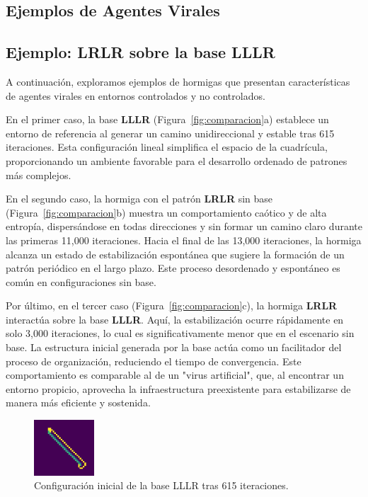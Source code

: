 \documentclass[11pt,letterpaper]{article}
\begin{document}
\begin{multicols}{2}
\section{Ejemplos de Agentes Virales}

\subsection{Ejemplo: LRLR sobre la base LLLR}

A continuación, exploramos ejemplos de hormigas que presentan características de agentes virales en entornos controlados y no controlados.

En el primer caso, la base \textbf{LLLR} (Figura~\ref{fig:comparacion}a) establece un entorno de referencia al generar un camino unidireccional y estable tras 615 iteraciones. Esta configuración lineal simplifica el espacio de la cuadrícula, proporcionando un ambiente favorable para el desarrollo ordenado de patrones más complejos.

En el segundo caso, la hormiga con el patrón \textbf{LRLR} sin base (Figura~\ref{fig:comparacion}b) muestra un comportamiento caótico y de alta entropía, dispersándose en todas direcciones y sin formar un camino claro durante las primeras 11,000 iteraciones. Hacia el final de las 13,000 iteraciones, la hormiga alcanza un estado de estabilización espontánea que sugiere la formación de un patrón periódico en el largo plazo. Este proceso desordenado y espontáneo es común en configuraciones sin base.

Por último, en el tercer caso (Figura~\ref{fig:comparacion}c), la hormiga \textbf{LRLR} interactúa sobre la base \textbf{LLLR}. Aquí, la estabilización ocurre rápidamente en solo 3,000 iteraciones, lo cual es significativamente menor que en el escenario sin base. La estructura inicial generada por la base actúa como un facilitador del proceso de organización, reduciendo el tiempo de convergencia. Este comportamiento es comparable al de un "virus artificial", que, al encontrar un entorno propicio, aprovecha la infraestructura preexistente para estabilizarse de manera más eficiente y sostenida.
\begin{figure}[h!]
    \centering
    \includegraphics[width=0.2\textwidth]{reportTemplate/figures/lllr_615.png}
    \caption{Configuración inicial de la base LLLR tras 615 iteraciones.}
    \label{fig:lllr_615}
\end{figure}


\end{multicols}
\end{document}
